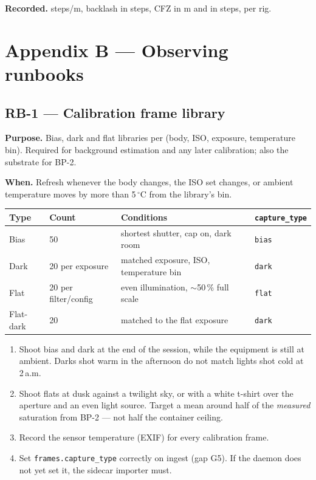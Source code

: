 \documentclass[11pt]{article}
\newcommand{\co}[1]{\texttt{\small #1}}
\begin{document}
\textbf{Recorded.} steps/\textmu m, backlash in steps, CFZ in \textmu m and in
steps, per rig.

\section*{Appendix B --- Observing runbooks}

\subsection*{RB-1 --- Calibration frame library}

\textbf{Purpose.} Bias, dark and flat libraries per (body, ISO, exposure,
temperature bin). Required for background estimation and any later calibration;
also the substrate for BP-2.

\textbf{When.} Refresh whenever the body changes, the ISO set changes, or
ambient temperature moves by more than 5\,$^\circ$C from the library's bin.

\begin{center}
\small
\begin{tabular}{@{}llll@{}}
\toprule
\textbf{Type} & \textbf{Count} & \textbf{Conditions} & \co{capture\_type} \\
\midrule
Bias & 50 & shortest shutter, cap on, dark room & \co{bias} \\
Dark & 20 per exposure & matched exposure, ISO, temperature bin & \co{dark} \\
Flat & 20 per filter/config & even illumination, $\sim$50\,\% full scale & \co{flat} \\
Flat-dark & 20 & matched to the flat exposure & \co{dark} \\
\bottomrule
\end{tabular}
\end{center}

\begin{enumerate}
\item Shoot bias and dark at the end of the session, while the equipment is
      still at ambient. Darks shot warm in the afternoon do not match lights
      shot cold at 2\,a.m.
\item Shoot flats at dusk against a twilight sky, or with a white t-shirt over
      the aperture and an even light source. Target a mean around half of the
      \emph{measured} saturation from BP-2 --- not half the container ceiling.
\item Record the sensor temperature (EXIF) for every calibration frame.
\item Set \co{frames.capture\_type} correctly on ingest (gap G5). If the daemon
      does not yet set it, the sidecar importer must.
\end{enumerate}
\end{document}
